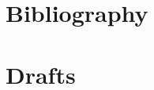 \documentclass[10pt,letterpaper,onecolumn,draftclsnofoot]{IEEEtran}
\begin{document}
\section{Bibliography}



\section{Drafts}






%
%
%
%
\end{document}
